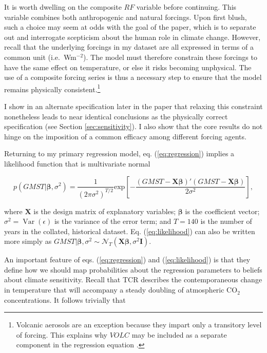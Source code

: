 \documentclass[smallextended]{svjour3}       %
\begin{document}
It is worth dwelling on the composite \(RF\) variable before continuing.
This variable combines both anthropogenic and natural forcings. Upon
first blush, such a choice may seem at odds with the goal of the paper,
which is to separate out and interrogate scepticism about the human role
in climate change. However, recall that the underlying forcings in my
dataset are all expressed in terms of a common unit (i.e.~Wm\(^{-2}\)).
The model must therefore constrain these forcings to have the same
effect on temperature, or else it risks becoming unphysical. The use of
a composite forcing series is thus a necessary step to ensure that the
model remains physically consistent.\footnote{Volcanic aerosols are an
  exception because they impart only a transitory level of forcing. This
  explains why \(VOLC\) may be included as a separate component in the
  regression equation \cite{estrada2013statistically}.}

I show in an alternate specification later in the paper that relaxing
this constraint nonetheless leads to near identical conclusions as the
physically correct specification (see Section \ref{sec:sensitivity}). I
also show that the core results do not hinge on the imposition of a
common efficacy among different forcing agents.

Returning to my primary regression model, eq. (\ref{eq:regression})
implies a likelihood function that is multivariate normal

\begin{equation}
   p(GMST | \boldsymbol{\beta}, \sigma^2) =  \frac{1}{\left(2 \pi \sigma^2\right)^{T/2}} \text{exp}\left[ - \frac{(GMST - \mathbf{X}\boldsymbol{\beta})'(GMST - \mathbf{X}\boldsymbol{\beta})}{2 \sigma^2} \right], \label{eq:likelihood}
\end{equation}

where \(\mathbf{X}\) is the design matrix of explanatory variables;
\(\boldsymbol{\beta}\) is the coefficient vector;
\(\sigma^2 = \mathop{\mathrm{Var}}(\epsilon)\) is the variance of the
error term; and \(T=140\) is the number of years in the collated,
historical dataset. Eq. (\ref{eq:likelihood}) can also be written more
simply as
\(GMST | \boldsymbol{\beta}, \sigma^2 \sim \mathcal{N}_T(\mathbf{X}\boldsymbol{\beta}, \sigma^2\mathbf{I})\).

An important feature of eqs. (\ref{eq:regression}) and
(\ref{eq:likelihood}) is that they define how we should map
probabilities about the regression parameters to beliefs about climate
sensitivity. Recall that TCR describes the contemporaneous change in
temperature that will accompany a steady doubling of atmospheric
CO\(_2\) concentrations. It follows trivially that
\end{document}
